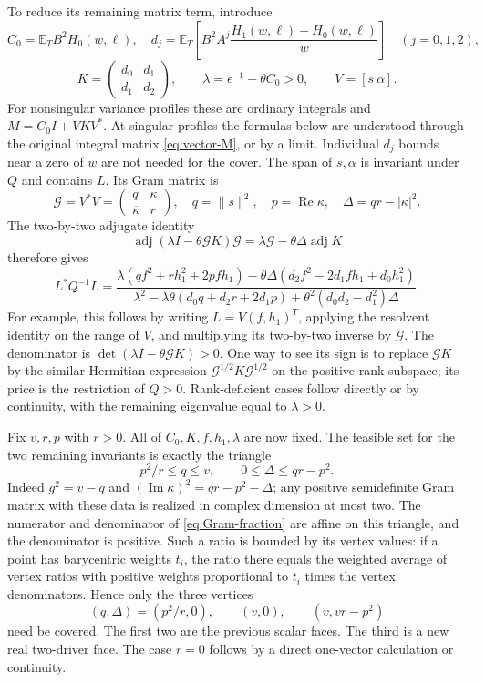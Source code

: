 To reduce its remaining matrix term, introduce
\[
 C_0=\mathbb E_T B^2H_0(w,\ell),\quad
 d_j=\mathbb E_T\left[B^2A^j
              \frac{H_1(w,\ell)-H_0(w,\ell)}w\right]\quad(j=0,1,2),
\]
\[
 K=\begin{pmatrix}d_0&d_1\\d_1&d_2\end{pmatrix},\qquad
 \lambda=\epsilon^{-1}-\theta C_0>0,\qquad V=[s\ \alpha].
\]
For nonsingular variance profiles these are ordinary integrals and
$M=C_0I+VKV^*$.  At singular profiles the formulas below are understood
through the original integral matrix \eqref{eq:vector-M}, or by a limit.
Individual $d_j$ bounds near a zero of $w$ are not needed for the cover.
The span of $s,\alpha$ is invariant under $Q$ and contains $L$.
Its Gram matrix is
\[
 \mathcal G=V^*V=\begin{pmatrix}q&\kappa\\\overline\kappa&r\end{pmatrix},
 \quad q=\|s\|^2,\quad p=\operatorname{Re}\kappa,
 \quad \Delta=qr-|\kappa|^2.
\]
The two-by-two adjugate identity
\[
 \operatorname{adj}(\lambda I-\theta\mathcal GK)\mathcal G
       =\lambda\mathcal G-\theta\Delta\operatorname{adj}K
\]
therefore gives
\begin{equation}
 L^*Q^{-1}L=
 \frac{\lambda(qf^2+rh_1^2+2pfh_1)
       -\theta\Delta(d_2f^2-2d_1fh_1+d_0h_1^2)}
 {\lambda^2-\lambda\theta(d_0q+d_2r+2d_1p)
                  +\theta^2(d_0d_2-d_1^2)\Delta}.
 \label{eq:Gram-fraction}
\end{equation}
For example, this follows by writing $L=V(f,h_1)^T$, applying the
resolvent identity on the range of $V$, and multiplying its two-by-two
inverse by $\mathcal G$.  The denominator is
$\det(\lambda I-\theta\mathcal GK)>0$.  One way to see its sign is to
replace $\mathcal GK$ by the similar Hermitian expression
$\mathcal G^{1/2}K\mathcal G^{1/2}$ on the positive-rank subspace; its
price is the restriction of $Q>0$.  Rank-deficient cases follow directly
or by continuity, with the remaining eigenvalue equal to $\lambda>0$.

Fix $v,r,p$ with $r>0$.  All of $C_0,K,f,h_1,\lambda$ are now fixed.
The feasible set for the two remaining invariants is exactly the triangle
\[
 p^2/r\le q\le v,\qquad 0\le\Delta\le qr-p^2.
\]
Indeed $g^2=v-q$ and
$(\operatorname{Im}\kappa)^2=qr-p^2-\Delta$; any positive semidefinite
Gram matrix with these data is realized in complex dimension at most two.
The numerator and denominator of \eqref{eq:Gram-fraction} are affine on
this triangle, and the denominator is positive.  Such a ratio is bounded
by its vertex values: if a point has barycentric weights $t_i$, the ratio
there equals the weighted average of vertex ratios with positive weights
proportional to $t_i$ times the vertex denominators.  Hence only the three
vertices
\[
 (q,\Delta)=(p^2/r,0),\qquad (v,0),\qquad (v,vr-p^2)
\]
need be covered.  The first two are the previous scalar faces.  The third
is a new real two-driver face.  The case $r=0$ follows by a direct
one-vector calculation or continuity.

